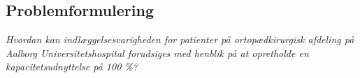 \subsection{Problemformulering}
\textit{Hvordan kan indlæggelsesvarigheden for patienter på ortopædkirurgisk afdeling på Aalborg Universitetshospital forudsiges med henblik på at opretholde en kapacitetsudnyttelse på 100 \%?}